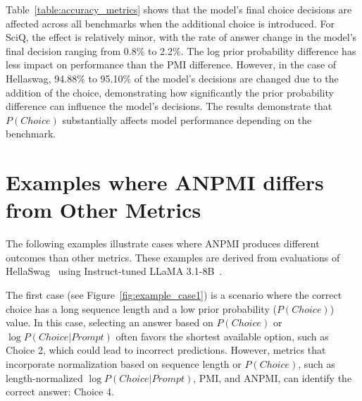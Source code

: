 \begin{table}[ht]
\centering
\caption{{The rate of answer change in the model's final decision on choices when the additional choice "Hi" is introduced.}}
\vspace{-0.5\baselineskip} %
\label{table:accuracy_metrics}
\end{table}

{Table\mbox{~\ref{table:accuracy_metrics}} shows that the model's final choice decisions are affected across all benchmarks when the additional choice is introduced. For SciQ, the effect is relatively minor, with the rate of answer change in the model's final decision ranging from 0.8\% to 2.2\%. 
The log prior probability difference has less impact on performance than the PMI difference. However, in the case of Hellaswag, 94.88\% to 95.10\% of the model's decisions are changed due to the addition of the choice, demonstrating how significantly the prior probability difference can influence the model's decisions. The results demonstrate that \mbox{\small $P(Choice)$} substantially affects model performance depending on the benchmark.}


\section{Examples where ANPMI differs from Other Metrics}
\label{sec:comp_example}

{The following examples illustrate cases where ANPMI produces different outcomes than other metrics. These examples are derived from evaluations of HellaSwag\hbox{~\cite{hellaswag}} using Instruct-tuned LLaMA 3.1-8B\hbox{~\cite{dubey2024llama}}.}

{The first case (see Figure\hbox{~\ref{fig:example_case1}}) is a scenario where the correct choice has a long sequence length and a low prior probability (\hbox{$P(Choice)$}) value. In this case, selecting an answer based on \hbox{$P(Choice)$} or \hbox{$\log P(Choice | Prompt)$} often favors the shortest available option, such as Choice 2, which could lead to incorrect predictions. However, metrics that incorporate normalization based on sequence length or \hbox{$P(Choice)$}, such as length-normalized \hbox{$\log P(Choice | Prompt)$}, PMI, and ANPMI, can identify the correct answer: Choice 4.}

